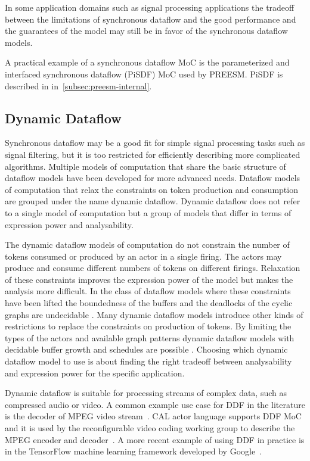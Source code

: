 In some application domains such as signal processing applications the tradeoff between the limitations of synchronous dataflow and the good performance and the guarantees of the model may still be in favor of the synchronous dataflow models.~\cite{lee2015introduction}

A practical example of a synchronous dataflow MoC is the parameterized and interfaced synchronous dataflow (PiSDF) MoC used by PREESM. PiSDF is described in in~\ref{subsec:preesm-internal}.

\subsection{Dynamic Dataflow}
\label{subsec:dynamic-dataflow}
Synchronous dataflow may be a good fit for simple signal processing tasks such as signal filtering, but it is too restricted for efficiently describing more complicated algorithms. Multiple models of computation that share the basic structure of dataflow models have been developed for more advanced needs. Dataflow models of computation that relax the constraints on token production and consumption are grouped under the name dynamic dataflow. Dynamic dataflow does not refer to a single model of computation but a group of models that differ in terms of expression power and analysability.~\cite{bhattacharyya2013handbook}

The dynamic dataflow models of computation do not constrain the number of tokens consumed or produced by an actor in a single firing. The actors may produce and consume different numbers of tokens on different firings. Relaxation of these constraints improves the expression power of the model but makes the analysis more difficult. In the class of dataflow models where these constraints have been lifted the boundedness of the buffers and the deadlocks of the cyclic graphs are undecidable \cite{buck1993scheduling}. Many dynamic dataflow models introduce other kinds of restrictions to replace the constraints on production of tokens. By limiting the types of the actors and available graph patterns dynamic dataflow models with decidable buffer growth and schedules are possible \cite{bhattacharyya2013handbook, gao1992well}. Choosing which dynamic dataflow model to use is about finding the right tradeoff between analysability and expression power for the specific application.

Dynamic dataflow is suitable for processing streams of complex data, such as compressed audio or video. A common example use case for DDF in the literature is the decoder of MPEG video stream~\cite{bhattacharyya2013handbook}. CAL actor language supports DDF MoC and it is used by the reconfigurable video coding working group to describe the MPEG encoder and decoder~\cite{bhattacharyya2011overview}. A more recent example of using DDF in practice is in the TensorFlow machine learning framework developed by Google~\cite{tensorflow2015-whitepaper}.
